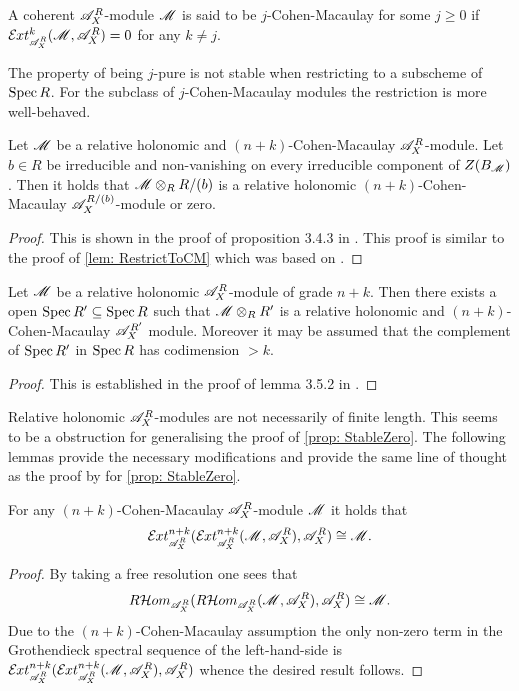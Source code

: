 \begin{definition}
  A coherent $\mathscr{A}_X^R$-module $\mathscr{M}$ is said to be $j$-Cohen-Macaulay for some $j\geq 0$ if $\Ex{\A_X^R}{k}(\M,\A_X^R) = 0$ for any $k\neq j$.
\end{definition}
The property of being $j$-pure is not stable when restricting to a subscheme of $\operatorname{Spec} R$.
For the subclass of $j$-Cohen-Macaulay modules the restriction is more well-behaved.
\begin{lemma}\label{lem: CMLemmaBudur}
  Let $\mathscr{M}$ be a relative holonomic and $(n+k)$-Cohen-Macaulay $\mathscr{A}_X^R$-module. Let $b\in R$ be irreducible and non-vanishing on every irreducible component of $Z(B_{\mathscr{M}})$. Then it holds that $\mathscr{M}\otimes_R R/(b)$ is a relative holonomic $(n+k)$-Cohen-Macaulay $\mathscr{A}_X^{R/(b)}$-module or zero.
\end{lemma}
\begin{proof}
  This is shown in the proof of proposition 3.4.3 in \cite{budur2019zero}. This proof is similar to the proof of \cref{lem: RestrictToCM} which was based on \cite{budur2019zero}.
\end{proof}
\begin{lemma}\label{lem: GradeToCMOverOpen}
  Let $\mathscr{M}$ be a relative holonomic $\mathscr{A}_X^R$-module of grade $n+k$. Then there exists a open $\operatorname{Spec} R' \subseteq \operatorname{Spec} R$ such that $\mathscr{M}\otimes_R R'$ is a relative holonomic and $(n+k)$-Cohen-Macaulay $\mathscr{A}_X^{R'}$ module. Moreover it may be assumed that the complement of $\operatorname{Spec} R'$ in $\operatorname{Spec} R$ has codimension $>k$.
\end{lemma}
\begin{proof}
  This is established in the proof of lemma 3.5.2 in \cite{budur2019zero}.
\end{proof}
Relative holonomic $\mathscr{A}_X^R$-modules are not necessarily of finite length.
This seems to be a obstruction for generalising the proof of \cref{prop: StableZero}.
The following lemmas provide the necessary modifications and provide the same line of thought as the proof by \cite{kashiwara1976b} for \cref{prop: StableZero}.
\begin{lemma}
  For any $(n+k)$-Cohen-Macaulay $\mathscr{A}_X^R$-module $\mathscr{M}$ it holds that  $$\Ex{\A_X^R}{n+k}(\Ex{\A_X^R}{n+k}(\M,\A_X^R),\A_X^R) \cong \M.$$
\end{lemma}
\begin{proof}
  By taking a free resolution one sees that
  $$R\mathcal{H}om_{\mathscr{A}_X^R}(R\mathcal{H}om_{\mathscr{A}_X^R}(\mathscr{M}, \mathscr{A}_X^R),\mathscr{A}_X^R) \cong \mathscr{M}.$$
  Due to the $(n+k)$-Cohen-Macaulay assumption the only non-zero term in the Grothendieck spectral sequence of the left-hand-side is $\Ex{\A_X^R}{n+k}(\Ex{\A_X^R}{n+k}(\M,\A_X^R),\A_X^R)$ whence the desired result follows.
\end{proof}


